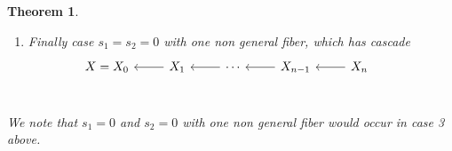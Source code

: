 \documentclass[12pt,a4paper]{book}      %
\newtheorem{thm}{Theorem}[section]
\theoremstyle{definition}
\begin{document}
\begin{thm}
\begin{enumerate}
\[\begin{tikzcd}
      &                              &                               &                                      & X_1 \arrow[ld] \arrow[lu] & X_2 \arrow[l] & X_3 \arrow[l]\\
X_b^0 & X_b^1 \arrow[l] & \cdots \arrow[l] & X_b^{b-1} \arrow[l] &                                                           &                       
\end{tikzcd}
\]
\item Finally case $s_1 = s_2 =0$ with one non general fiber, which has cascade 
\[
\begin{tikzcd}
X = X_0 & X_1 \arrow[l] & \cdots \arrow[l] & X_{n-1} \arrow[l] & X_{n} \arrow[l]  &  \\
\end{tikzcd}
\]
\end{enumerate}
We note that $s_1=0$ and $s_2 = 0$ with one non general fiber would occur in case 3 above.



\end{thm}
\end{document}
